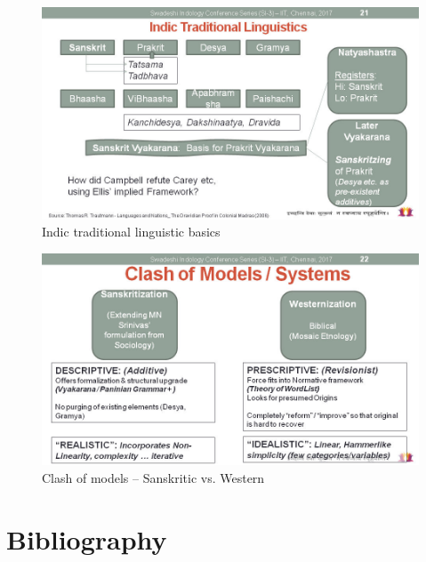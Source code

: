 \begin{figure}[!htbp]
\includegraphics[scale=0.29]{images/article-02/art02-fig02.jpg}
\caption{Indic traditional linguistic basics}\label{art2-fig02}
\end{figure}


\begin{figure}[!htbp]
\includegraphics[scale=0.3]{images/article-02/art02-fig03.jpg}
\caption{Clash of models – Sanskritic vs. Western}\label{art2-fig03}
\end{figure}


\section*{Bibliography}

